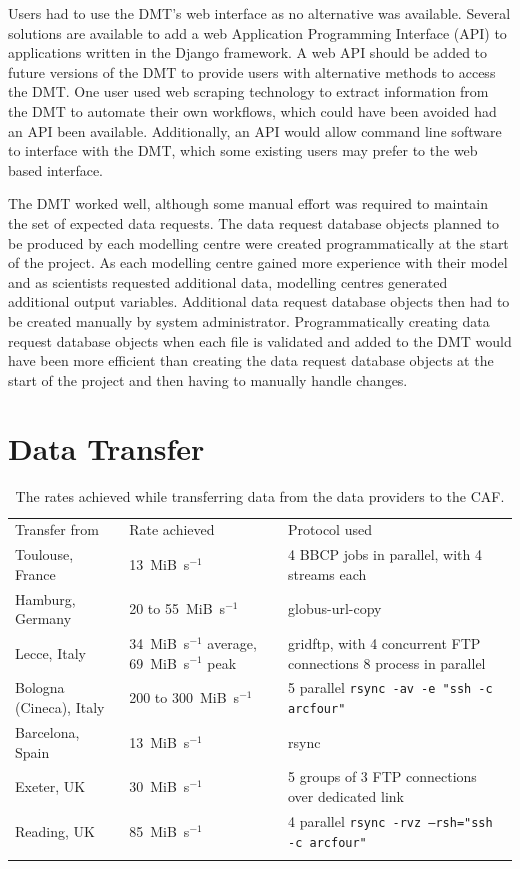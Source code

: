 \documentclass[gmd, manuscript]{copernicus}
\begin{document}
Users had to use the DMT's web interface as no alternative was available. Several solutions are available to add a web Application Programming Interface (API) to applications written in the Django framework. A web API should be added to future versions of the DMT to provide users with alternative methods to access the DMT. One user used web scraping technology to extract information from the DMT to automate their own workflows, which could have been avoided had an API been available. Additionally, an API would allow command line software to interface with the DMT, which some existing users may prefer to the web based interface.

The DMT worked well, although some manual effort was required to maintain the set of expected data requests. The data request database objects planned to be produced by each modelling centre were created programmatically at the start of the project. As each modelling centre gained more experience with their model and as scientists requested additional data, modelling centres generated additional output variables.  Additional data request database objects then had to be created manually by system administrator. Programmatically creating data request database objects when each file is validated and added to the DMT would have been more efficient than creating the data request database objects at the start of the project and then having to manually handle changes.

\section{Data Transfer}
\label{transfer_rates}

\begin{table}[ht]
	\caption{The rates achieved while transferring data from the data providers to the CAF.}
	\begin{tabular}{lll}
		\tophline
		Transfer from & Rate achieved & Protocol used \\
		\middlehline
		Toulouse, France & 13~MiB~s$^{-1}$ & 4 BBCP jobs in parallel, with 4 streams each \\
		Hamburg, Germany & 20 to 55~MiB~s$^{-1}$ & globus-url-copy \\
		Lecce, Italy & 34~MiB~s$^{-1}$ average, 69~MiB~s$^{-1}$ peak & gridftp, with 4 concurrent FTP connections 8 process in parallel \\
		Bologna (Cineca), Italy & 200 to 300~MiB~s$^{-1}$ & 5 parallel \texttt{rsync -av -e "ssh -c arcfour"} \\
		Barcelona, Spain & 13~MiB~s$^{-1}$ & rsync \\
		Exeter, UK & 30~MiB~s$^{-1}$ & 5 groups of 3 FTP connections over dedicated link \\
		Reading, UK & 85~MiB~s$^{-1}$ & 4 parallel \texttt{rsync -rvz --rsh="ssh -c arcfour"} \\
		\bottomhline
	\end{tabular}
	\belowtable{} %
	\label{rates_achieved}
\end{table}
\end{document}
